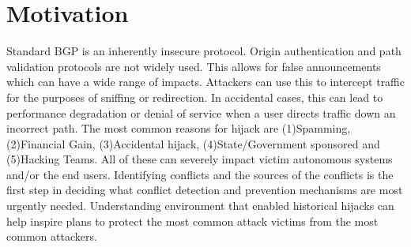  \section{Motivation}\label{sec:motivation}
Standard BGP is an inherently insecure protocol. Origin authentication and path validation protocols are not widely used. This allows for false announcements which can have a wide range of impacts. Attackers can use this to intercept traffic for the purposes of sniffing or redirection. In accidental cases, this can lead to performance degradation or denial of service when a user directs traffic down an incorrect path. The most common reasons for hijack are (1)Spamming, (2)Financial Gain, (3)Accidental hijack, (4)State/Government sponsored and (5)Hacking Teams. All of these can severely impact victim autonomous systems and/or the end users. Identifying conflicts and the sources of the conflicts is the first step in deciding what conflict detection and prevention mechanisms are most urgently needed. Understanding environment that enabled historical hijacks can help inspire plans to protect the most common attack victims from the most common attackers. 


